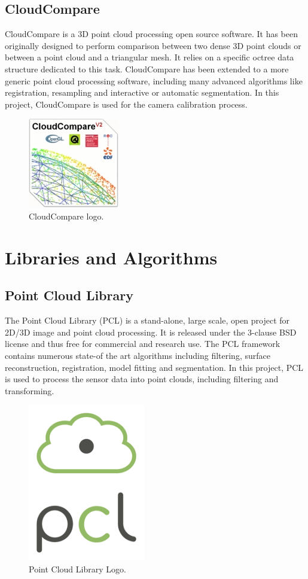 \subsection{CloudCompare}
\label{subsec:cloudcomp}
CloudCompare is a 3D point cloud processing open source software. It has been originally designed to perform comparison between two dense 3D point clouds or between a point cloud and a triangular mesh. It relies on a specific octree data structure dedicated to this task. CloudCompare has been extended to a more generic point cloud processing software, including many advanced algorithms like registration, resampling and interactive or automatic segmentation. In this project, CloudCompare is used for the camera calibration process.

\begin{figure}[H]
	\centering\includegraphics[scale=1]{images/cc_logo_v2_small.jpg}		
	\caption{CloudCompare logo.}
\end{figure}


\section{Libraries and Algorithms}
\label{sec:libalg}


\subsection{Point Cloud Library}
\label{subsec:pcl}
The Point Cloud Library (PCL) is a stand-alone, large scale, open project for 2D/3D image and point cloud processing. It is released under the  3-clause BSD license and thus free for commercial and research use. The PCL framework contains numerous state-of the art algorithms including filtering, surface reconstruction, registration, model fitting and segmentation. In this project, PCL is used to process the sensor data into point clouds, including filtering and transforming.

\begin{figure}[H]
	\centering\includegraphics[scale=0.7]{images/pcl.png}			
	\caption{Point Cloud Library Logo.}
\end{figure}


